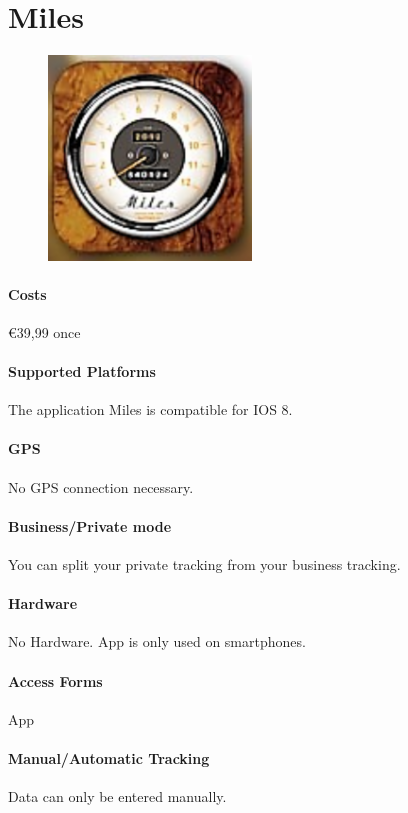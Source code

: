 \section{Miles}  
\begin{figure}
  \begin{center}
    \includegraphics[width=0.48\textwidth]{bilder/miles}
  \end{center}
\end{figure}
\paragraph{Costs} \euro 39,99 once
\paragraph{Supported Platforms} The application Miles is compatible for IOS 8.
\paragraph{GPS} No GPS connection necessary.
\paragraph{Business/Private mode} You can split your private tracking from your business tracking.
\paragraph{Hardware} No Hardware. App is only used on smartphones.
\paragraph{Access Forms} App
\paragraph{Manual/Automatic Tracking} Data can only be entered manually.
